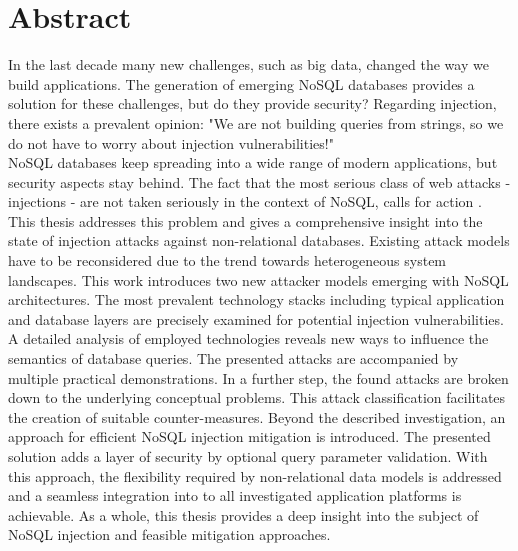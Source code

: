 \chapter*{Abstract} %
In the last decade many new challenges, such as big data, changed the way we build applications. The generation of emerging NoSQL databases provides a solution for these challenges, but do they provide security? Regarding injection, there exists a prevalent opinion: "We are not building queries from strings, so we do not have to worry about injection vulnerabilities!" \cite{MongoDB_Fundamentals:2016} \\

NoSQL databases keep spreading into a wide range of modern applications, but security aspects stay behind. The fact that the most serious class of web attacks - injections - are not taken seriously in the context of NoSQL, calls for action \cite{OWASP:2013b}. This thesis addresses this problem and gives a comprehensive insight into the state of injection attacks against non-relational databases. Existing attack models have to be reconsidered due to the trend towards heterogeneous system landscapes. This work introduces two new attacker models emerging with NoSQL architectures. The most prevalent technology stacks including typical application and database layers are precisely examined for potential injection vulnerabilities. A detailed analysis of employed technologies reveals new ways to influence the semantics of database queries. The presented attacks are accompanied by multiple practical demonstrations. In a further step, the found attacks are broken down to the underlying conceptual problems. This attack classification facilitates the creation of suitable counter-measures. Beyond the described investigation, an approach for efficient NoSQL injection mitigation is introduced. The presented solution adds a layer of security by optional query parameter validation. With this approach, the flexibility required by non-relational data models is addressed and a seamless integration into to all investigated application platforms is achievable. As a whole, this thesis provides a deep insight into the subject of NoSQL injection and feasible mitigation approaches.